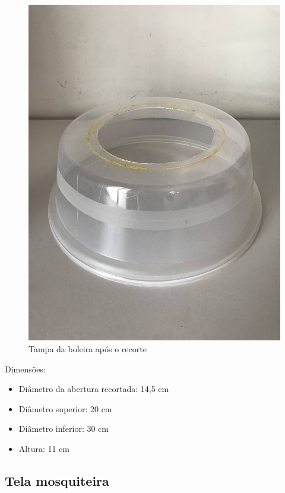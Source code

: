 \documentclass[
	12pt,				%
	openright,			%
	oneside,			%
	a4paper,			%
	chapter=TITLE,		%
	english,			%
	brazil				%
	]{abntex2}
\begin{document}
\begin{figure}[H]
    \centering
    \includegraphics[scale=0.04, angle=-90]{imagens/IMG_0603.jpg}
    \caption{Tampa da boleira após o recorte}
    \label{fig:boleirarecorte}
\end{figure}        
Dimensões: 

\begin{itemize}
    \item Diâmetro da abertura recortada: 14,5 cm
    \item Diâmetro superior: 20 cm
    \item Diâmetro inferior: 30 cm
    \item Altura: 11 cm
\end{itemize}

\subsection{Tela mosquiteira}
\end{document}
